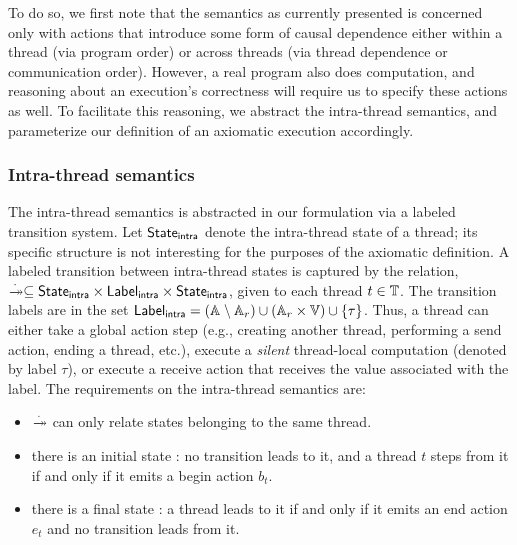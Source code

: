 To do so, we first note that the semantics as currently presented is concerned
only with actions that introduce some form of causal dependence either within a
thread (via program order) or across threads (via thread dependence or
communication order). However, a real program also does computation, and
reasoning about an execution's correctness will require us to specify these
actions as well. To facilitate this reasoning, we abstract the intra-thread
semantics, and parameterize our definition of an axiomatic execution accordingly.

\subsubsection{Intra-thread semantics} The intra-thread semantics is abstracted
in our formulation via a labeled transition system.  Let ${\sf State}_{\sf intra}$ denote
the intra-thread state of a thread; its specific structure is not interesting
for the purposes of the axiomatic definition. A labeled transition between
intra-thread states is captured by the relation, $\intratrans{.} \subseteq
\intrastate \times \intralabel \times \intrastate$, given to each thread $t \in
\mathbb{T}$. The transition labels are in the set ${\sf Label}_{\sf intra} =
(\mathbb{A}_{} \setminus \mathbb{A}_{r}) \cup (\mathbb{A}_{r} \times
\mathbb{V}) \cup \{\tau\}$.  Thus, a thread can either take a global action
step (e.g., creating another thread, performing a send action, ending a thread,
etc.), execute a \emph{silent} thread-local computation (denoted by label
$\tau$), or execute a receive action that receives the value associated with
the label. The requirements on the intra-thread semantics are:

\begin{itemize}
\item $\intratrans{.}$ can only relate states belonging to the same thread.
\item there is an initial state \ready: no transition leads to it,
	and a thread $t$ steps from it if and only if it emits a begin action $b_t$.
\item there is a final state \done: a thread leads to it if and only if it
	emits an end action $e_t$ and no transition leads from it.
\end{itemize}

